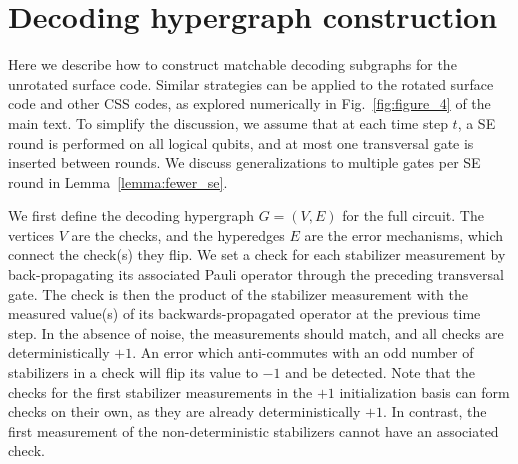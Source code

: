 \documentclass[prx,twocolumn,secnumarabic,balancelastpage,amsmath,amssymb,longbibliography]{revtex4-2}
\begin{document}
\section{Decoding hypergraph construction\label{appendix:decoding_hypergraph}}
Here we describe how to construct matchable decoding subgraphs for the unrotated surface code. 
%
Similar strategies can be applied to the rotated surface code and other CSS codes, as explored numerically in Fig.~\ref{fig:figure_4} of the main text.
%
To simplify the discussion, we assume that at each time step $t$, a SE round is performed on all logical qubits, and at most one transversal gate is inserted between rounds. 
%
We discuss generalizations to multiple gates per SE round in Lemma~\ref{lemma:fewer_se}.

We first define the decoding hypergraph $G=(V, E)$ for the full circuit.
%
The vertices $V$ are the checks, and the hyperedges $E$ are the error mechanisms, which connect the check(s) they flip.
%
We set a check for each stabilizer measurement by back-propagating its associated Pauli operator through the preceding transversal gate.
%
The check is then the product of the stabilizer measurement with the measured value(s) of its backwards-propagated operator at the previous time step.
% 
In the absence of noise, the measurements should match, and all checks are deterministically $+1$.
%
An error which anti-commutes with an odd number of stabilizers in a check will flip its value to $-1$ and be detected.
%
Note that the checks for the first stabilizer measurements in the $+1$ initialization basis can form checks on their own, as they are already deterministically $+1$.
%
In contrast, the first measurement of the non-deterministic stabilizers cannot have an associated check.
\end{document}
